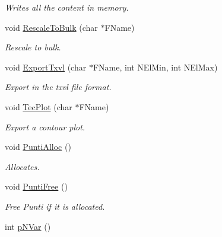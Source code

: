 \begin{DoxyCompactItemize}
\begin{DoxyCompactList}\small\item\em \-Writes all the content in memory. \end{DoxyCompactList}\item 
\hypertarget{classVarDatFile_a50acf56d68429e9660e2bfc4f7530521}{void \hyperlink{classVarDatFile_a50acf56d68429e9660e2bfc4f7530521}{\-Rescale\-To\-Bulk} (char $\ast$\-F\-Name)}\label{classVarDatFile_a50acf56d68429e9660e2bfc4f7530521}

\begin{DoxyCompactList}\small\item\em \-Rescale to bulk. \end{DoxyCompactList}\item 
\hypertarget{classVarDatFile_a87e9980dd97eda060a3dcaddd1d692d4}{void \hyperlink{classVarDatFile_a87e9980dd97eda060a3dcaddd1d692d4}{\-Export\-Txvl} (char $\ast$\-F\-Name, int \-N\-El\-Min, int \-N\-El\-Max)}\label{classVarDatFile_a87e9980dd97eda060a3dcaddd1d692d4}

\begin{DoxyCompactList}\small\item\em \-Export in the txvl file format. \end{DoxyCompactList}\item 
\hypertarget{classVarDatFile_ace7cb52bc9334449375e6e0456161120}{void \hyperlink{classVarDatFile_ace7cb52bc9334449375e6e0456161120}{\-Tec\-Plot} (char $\ast$\-F\-Name)}\label{classVarDatFile_ace7cb52bc9334449375e6e0456161120}

\begin{DoxyCompactList}\small\item\em \-Export a contour plot. \end{DoxyCompactList}\item 
void \hyperlink{classVarDatFile_a38ef005b54f94a56824e7240876e9c03}{\-Punti\-Alloc} ()
\begin{DoxyCompactList}\small\item\em \-Allocates. \end{DoxyCompactList}\item 
\hypertarget{classVarDatFile_aab87873039820cc1aca0c444c43d9a5e}{void \hyperlink{classVarDatFile_aab87873039820cc1aca0c444c43d9a5e}{\-Punti\-Free} ()}\label{classVarDatFile_aab87873039820cc1aca0c444c43d9a5e}

\begin{DoxyCompactList}\small\item\em \-Free \-Punti if it is allocated. \end{DoxyCompactList}\item 
\hypertarget{classVarDatFile_aff25aa77a033788903eee04852e24cb6}{int \hyperlink{classVarDatFile_aff25aa77a033788903eee04852e24cb6}{p\-N\-Var} ()}\label{classVarDatFile_aff25aa77a033788903eee04852e24cb6}


\end{DoxyCompactItemize}
